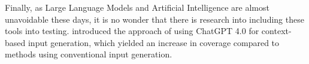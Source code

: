 Finally, as Large Language Models and Artificial Intelligence are almost unavoidable these days, it is no wonder that there is research into including these tools into testing. \citet{xu_symbolic_2024} introduced the approach of using ChatGPT 4.0 \cite{openai_chatgpt_2025} for context-based input generation, which yielded an increase in coverage compared to methods using conventional input generation.